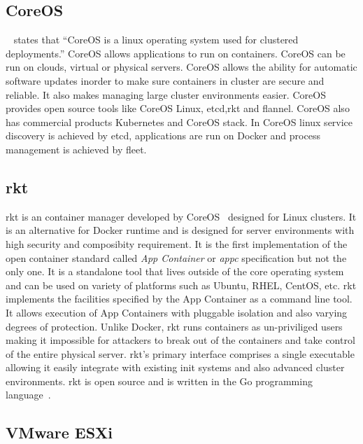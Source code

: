 \subsection{CoreOS \cv}
~\cite{www-core} states that ``CoreOS is a linux operating system used
for clustered deployments.'' CoreOS allows applications to run on
containers. CoreOS can be run on clouds, virtual or physical
servers. CoreOS allows the ability for automatic software updates
inorder to make sure containers in cluster are secure and reliable. It
also makes managing large cluster environments easier. CoreOS provides
open source tools like CoreOS Linux, etcd,rkt and flannel. CoreOS also
has commercial products Kubernetes and CoreOS stack. In CoreOS linux
service discovery is achieved by etcd, applications are run on Docker
and process management is achieved by fleet.

\subsection{rkt \cv}

rkt is an container manager developed by CoreOS~\cite{www-CoreOS}
designed for Linux clusters. It is an alternative for Docker runtime
and is designed for server environments with high security and
composibity requirement. It is the first implementation of the open
container standard called \textit{App Container} or \textit{appc}
specification but not the only one.  It is a standalone tool that
lives outside of the core operating system and can be used on variety
of platforms such as Ubuntu, RHEL, CentOS, etc. rkt implements the
facilities specified by the App Container as a command line tool. It
allows execution of App Containers with pluggable isolation and also
varying degrees of protection. Unlike Docker, rkt runs containers as
un-priviliged users making it impossible for attackers to break out of
the containers and take control of the entire physical server. rkt's
primary interface comprises a single executable allowing it easily
integrate with existing init systems and also advanced cluster
environments. rkt is open source and is written in the Go programming
language~\cite{www-github/rkt}.

     
\subsection{VMware ESXi}


